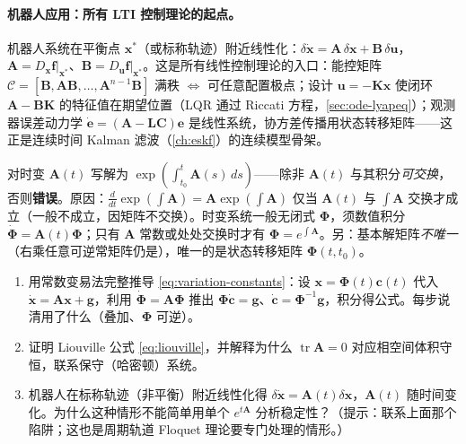 \paragraph{机器人应用：所有 LTI 控制理论的起点。}
机器人系统在平衡点 $\mathbf{x}^*$（或标称轨迹）附近线性化：$\delta\dot{\mathbf{x}}=\mathbf{A}\,\delta\mathbf{x}+\mathbf{B}\,\delta\mathbf{u}$，$\mathbf{A}=D_\mathbf{x}\mathbf{f}|_{\mathbf{x}^*}$、$\mathbf{B}=D_\mathbf{u}\mathbf{f}|_{\mathbf{x}^*}$。这是所有线性控制理论的入口：能控矩阵 $\mathcal{C}=[\mathbf{B},\mathbf{A}\mathbf{B},\dots,\mathbf{A}^{n-1}\mathbf{B}]$ 满秩 $\iff$ 可任意配置极点；设计 $\mathbf{u}=-\mathbf{K}\mathbf{x}$ 使闭环 $\mathbf{A}-\mathbf{B}\mathbf{K}$ 的特征值在期望位置（LQR 通过 Riccati 方程，\cref{sec:ode-lyapeq}）；观测器误差动力学 $\dot{\mathbf{e}}=(\mathbf{A}-\mathbf{L}\mathbf{C})\mathbf{e}$ 是线性系统，协方差传播用状态转移矩阵——这正是连续时间 Kalman 滤波（\cref{ch:eskf}）的连续模型骨架。

\begin{pitfall}
对时变 $\mathbf{A}(t)$ 写解为 $\exp(\int_{t_0}^t\mathbf{A}(s)\,ds)$——除非 $\mathbf{A}(t)$ 与其积分\emph{可交换}，否则\textbf{错误}。原因：$\frac{d}{dt}\exp(\int\mathbf{A})=\mathbf{A}\exp(\int\mathbf{A})$ 仅当 $\mathbf{A}(t)$ 与 $\int\mathbf{A}$ 交换才成立（一般不成立，因矩阵不交换）。时变系统一般无闭式 $\boldsymbol{\Phi}$，须数值积分 $\dot{\boldsymbol{\Phi}}=\mathbf{A}(t)\boldsymbol{\Phi}$；只有 $\mathbf{A}$ 常数或处处交换时才有 $\boldsymbol{\Phi}=e^{\int\mathbf{A}}$。另：基本解矩阵\emph{不唯一}（右乘任意可逆常矩阵仍是），唯一的是状态转移矩阵 $\boldsymbol{\Phi}(t,t_0)$。
\end{pitfall}

\begin{practice}
\begin{enumerate}
  \item 用常数变易法完整推导 \cref{eq:variation-constants}：设 $\mathbf{x}=\boldsymbol{\Phi}(t)\mathbf{c}(t)$ 代入 $\dot{\mathbf{x}}=\mathbf{A}\mathbf{x}+\mathbf{g}$，利用 $\dot{\boldsymbol{\Phi}}=\mathbf{A}\boldsymbol{\Phi}$ 推出 $\boldsymbol{\Phi}\dot{\mathbf{c}}=\mathbf{g}$、$\dot{\mathbf{c}}=\boldsymbol{\Phi}^{-1}\mathbf{g}$，积分得公式。每步说清用了什么（叠加、$\boldsymbol{\Phi}$ 可逆）。
  \item 证明 Liouville 公式 \cref{eq:liouville}，并解释为什么 $\operatorname{tr}\mathbf{A}=0$ 对应相空间体积守恒，联系保守（哈密顿）系统。
  \item 机器人在标称轨迹（非平衡）附近线性化得 $\delta\dot{\mathbf{x}}=\mathbf{A}(t)\delta\mathbf{x}$，$\mathbf{A}(t)$ 随时间变化。为什么这种情形不能简单用单个 $e^{t\mathbf{A}}$ 分析稳定性？（提示：联系上面那个陷阱；这也是周期轨道 Floquet 理论要专门处理的情形。）
\end{enumerate}
\end{practice}

